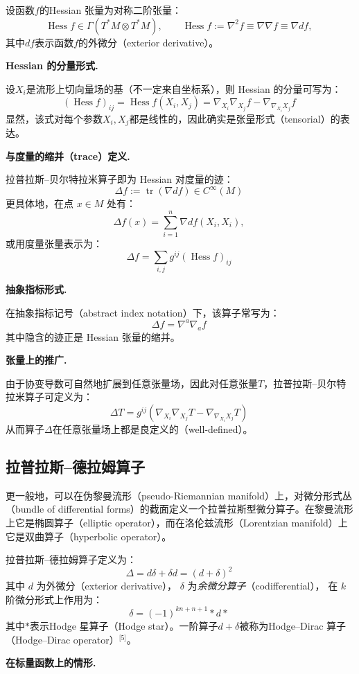 设函数$f$的Hessian 张量为对称二阶张量：
\[
\operatorname{Hess} f \in \Gamma(T^{*}M \otimes T^{*}M), \qquad
\operatorname{Hess} f := \nabla^{2} f \equiv \nabla \nabla f \equiv \nabla df,~
\]
其中$df$表示函数$f$的外微分（exterior derivative）。

\textbf{Hessian 的分量形式.}

设$X_{i}$是流形上切向量场的基（不一定来自坐标系），则 Hessian 的分量可写为：
\[
(\operatorname{Hess} f)_{ij}
= \operatorname{Hess} f(X_{i}, X_{j})
= \nabla_{X_{i}} \nabla_{X_{j}} f - \nabla_{\nabla_{X_{i}} X_{j}} f~
\]
显然，该式对每个参数$X_{i}, X_{j}$都是线性的，因此确实是张量形式（tensorial）的表达。

\textbf{与度量的缩并（trace）定义.}

拉普拉斯–贝尔特拉米算子即为 Hessian 对度量的迹：
\[
\Delta f := \operatorname{tr} (\nabla df) \in C^{\infty}(M)~
\]
更具体地，在点 $x \in M$ 处有：
\[
\Delta f(x) = \sum_{i=1}^{n} \nabla df(X_{i}, X_{i}),~
\]
或用度量张量表示为：
\[
\Delta f = \sum_{i,j} g^{ij} (\operatorname{Hess} f)_{ij}~
\]

\textbf{抽象指标形式.}

在抽象指标记号（abstract index notation）下，该算子常写为：
\[
\Delta f = \nabla^{a} \nabla_{a} f~
\]
其中隐含的迹正是 Hessian 张量的缩并。

\textbf{张量上的推广.}

由于协变导数可自然地扩展到任意张量场，因此对任意张量$T$，拉普拉斯–贝尔特拉米算子可定义为：
\[
\Delta T
= g^{ij} \left(
    \nabla_{X_{i}} \nabla_{X_{j}} T
    - \nabla_{\nabla_{X_{i}} X_{j}} T
  \right)~
\]
从而算子$\Delta$在任意张量场上都是良定义的（well-defined）。
\subsection{拉普拉斯–德拉姆算子}
更一般地，可以在伪黎曼流形（pseudo-Riemannian manifold）上，对微分形式丛（bundle of differential forms）的截面定义一个拉普拉斯型微分算子。在黎曼流形上它是椭圆算子（elliptic operator），而在洛伦兹流形（Lorentzian manifold）上它是双曲算子（hyperbolic operator）。

拉普拉斯–德拉姆算子定义为：
\[
\Delta = d\delta + \delta d = (d + \delta)^{2}~
\]
其中 $d$ 为外微分（exterior derivative），
$\delta$ 为\emph{余微分算子}（codifferential），
在 $k$ 阶微分形式上作用为：
\[
\delta = (-1)^{kn + n + 1} * d *~
\]
其中$*$表示Hodge 星算子（Hodge star）。一阶算子$d + \delta$被称为Hodge–Dirac 算子（Hodge–Dirac operator）\(^\text{[5]}\)。

\textbf{在标量函数上的情形.}


